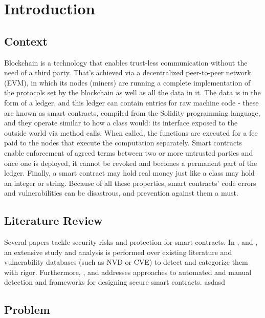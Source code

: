 \chapter{Introduction}        
\label{ch:introducao}

\section{Context}\label{contextualizacao}

Blockchain is a technology that enables trust-less communication without the need of a third party. That’s achieved via a decentralized peer-to-peer network (EVM), in which its nodes (miners) are running a complete implementation of the protocols set by the blockchain as well as all the data in it. The data is in the form of a ledger, and this ledger can contain entries for raw machine code - these are known as smart contracts, compiled from the Solidity programming language, and they operate similar to how a class would: its interface exposed to the outside world via method calls. When called, the functions are executed for a fee paid to the nodes that execute the computation separately. Smart contracts enable enforcement of agreed terms between two or more untrusted parties and once one is deployed, it cannot be revoked and becomes a permanent part of the ledger. Finally, a smart contract may hold real money just like a class may hold an integer or string. Because of all these properties, smart contracts’ code errors and vulnerabilities can be disastrous, and prevention against them a must.  

\section{Literature Review}

Several papers tackle security risks and protection for smart contracts. In \cite{chen2020survey}, \cite{kushwaha2022systematic} and \cite{sayeed2020smart}, an extensive study and analysis is performed over existing literature and vulnerability databases (such as NVD or CVE) to detect and categorize them with rigor. Furthermore, \cite{singh2020blockchain}, \cite{ali2021sescon} and \cite{vivar2021security} addresses approaches to automated and manual detection and frameworks for designing secure smart contracts.  
asdasd


\section{Problem}


